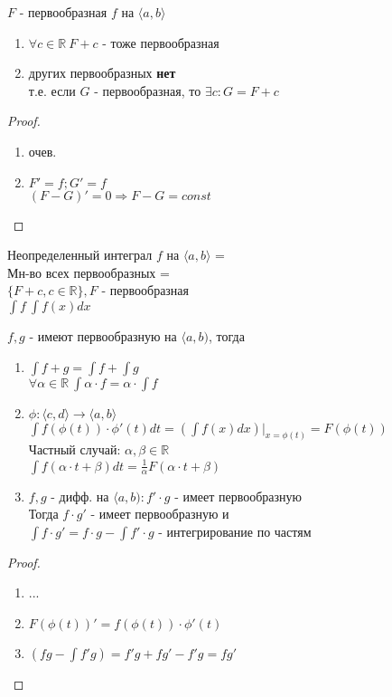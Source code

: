 \documentclass[12pt]{article}
\begin{document}
\begin{theorem}
  $F$ - первообразная $f$ на $\langle a, b \rangle$
  \begin{enumerate}
  \item $\forall c \in \mathbb{R}\ F + c$ - тоже первообразная
  \item других первообразных \textbf{нет} \\
    т.е. если $G$ - первообразная, то $\exists c: G = F + c$
  \end{enumerate}
  \begin{proof}
    \begin{enumerate}
    \item очев.
    \item $F' = f; G' = f$ \\
      $(F - G)' = 0 \Rightarrow F - G = const$
    \end{enumerate}
  \end{proof}
  \begin{definition}
    Неопределенный интеграл $f$ на $\langle a, b \rangle$ = \\
    Мн-во всех первообразных = \\
    $\{F + c, c \in \mathbb{R}\}, F$ - первообразная \\
    $\int{f}\ \int{f(x) dx}$
  \end{definition}
  \begin{theorem}
    $f, g$ - имеют первообразную на $\langle a, b)$, тогда \\
    \begin{enumerate}
    \item $\int f + g = \int f + \int g$ \\
      $\forall \alpha \in \mathbb{R}\ \int \alpha \cdot f = \alpha \cdot \int f$
    \item $\phi: \langle c, d \rangle \rightarrow \langle a, b \rangle$ \\
      $\int f(\phi (t)) \cdot \phi '(t) dt = (\int f(x) dx) \Big|_{x = \phi (t)} = F(\phi(t))$  \\
      Частный случай: $\alpha, \beta \in \mathbb{R}$ \\
      $\int f(\alpha \cdot t + \beta) dt = \frac{1}{\alpha}F(\alpha \cdot t + \beta)$
    \item $f, g$ - дифф. на $\langle a, b): f' \cdot g$ - имеет первообразную \\
      Тогда $f \cdot g'$ - имеет первообразную и \\
      $\int f \cdot g' = f \cdot g - \int f' \cdot g$ - интегрирование по частям
    \end{enumerate}
  \end{theorem}
  \begin{proof}
    \begin{enumerate}
    \item ...
    \item $F(\phi(t))' = f(\phi(t))\cdot \phi'(t)$
    \item $(fg - \int f'g) = f'g + fg' - f'g = fg'$
    \end{enumerate}
  \end{proof}
\end{theorem}
\end{document}
